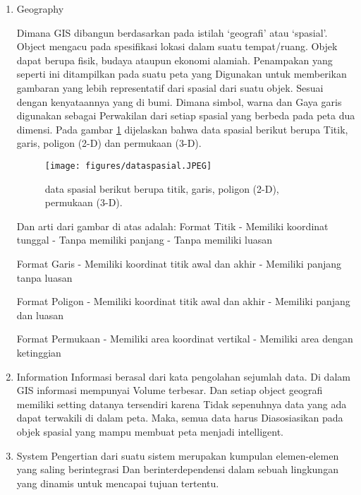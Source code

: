 \begin{enumerate}
\item Geography

Dimana GIS dibangun berdasarkan pada istilah ‘geografi’ atau ‘spasial’.
Object mengacu pada spesifikasi lokasi dalam suatu tempat/ruang. Objek dapat berupa fisik, budaya ataupun ekonomi alamiah. Penampakan yang seperti ini ditampilkan pada suatu peta yang 
Digunakan untuk memberikan gambaran yang lebih representatif dari spasial dari suatu objek.
Sesuai dengan kenyataannya yang di bumi. Dimana simbol, warna dan Gaya garis digunakan sebagai
Perwakilan dari setiap spasial yang berbeda pada peta dua dimensi.
Pada gambar \ref{data spasial} dijelaskan bahwa data spasial berikut berupa 
Titik, garis, poligon (2-D) dan permukaan (3-D).

\begin{figure}[ht]
	\centerline{\texttt{[image: figures/dataspasial.JPEG]}}
	\caption{data spasial berikut berupa titik, garis, poligon (2-D), permukaan (3-D).}
	\label{data spasial}
	\end{figure}

Dan arti dari gambar di atas adalah:
Format Titik 						
- Memiliki koordinat tunggal 		
- Tanpa memiliki panjang 			
- Tanpa memiliki luasan

Format Garis
- Memiliki koordinat titik awal dan akhir		
- Memiliki panjang tanpa luasan

Format Poligon 					
- Memiliki koordinat titik awal dan akhir
- Memiliki panjang dan luasan 		

Format Permukaan
- Memiliki area koordinat vertikal
- Memiliki area dengan ketinggian

\item Information
Informasi berasal dari kata pengolahan sejumlah data. Di dalam GIS informasi mempunyai
Volume terbesar. Dan setiap object geografi memiliki setting datanya tersendiri karena 
Tidak sepenuhnya data yang ada dapat terwakili di dalam peta. Maka, semua data harus
Diasosiasikan pada objek spasial yang mampu membuat peta menjadi intelligent.

\item System
Pengertian dari suatu sistem merupakan kumpulan elemen-elemen yang saling berintegrasi 
Dan berinterdependensi dalam sebuah lingkungan yang dinamis untuk mencapai tujuan tertentu.
\end{enumerate}

